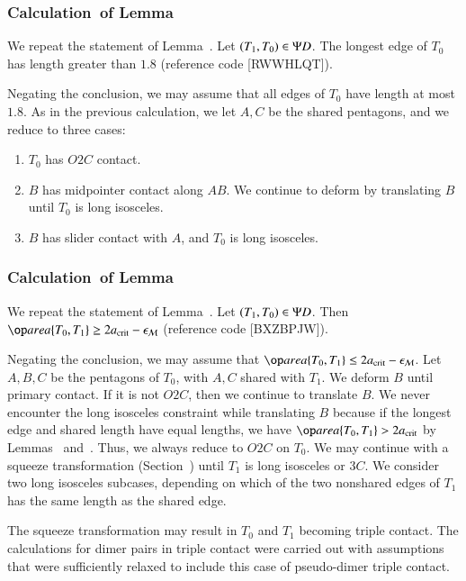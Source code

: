 \subsubsection{Calculation~of Lemma~} \label{sec:pseudo2}

We repeat the statement of Lemma~.
Let $(T_1,T_0)\in \Psi D$.  The longest edge of $T_0$
has length greater than $1.8$ (reference code [RWWHLQT]).


Negating the conclusion, we may assume that all edges of $T_0$ have
length at most $1.8$.  As in the previous calculation, we let $A,C$ be
the shared pentagons, and we reduce to three cases:
\begin{enumerate}
\item $T_0$ has $O2C$ contact.
\item $B$ has midpointer contact along $AB$.  We continue to deform by
  translating $B$ until $T_0$ is long isosceles.
\item $B$ has slider contact with $A$, and $T_0$ is long isosceles.
\end{enumerate}

\subsubsection{Calculation~of Lemma~} \label{sec:pseudo-area}

We repeat the statement of Lemma~.
Let $(T_1,T_0)\in\Psi D$.  Then $\area\{T_0,T_1\} \ge 2\acrit - \epsM$
(reference code [BXZBPJW]).

Negating the conclusion, we may assume that $\area\{T_0,T_1\}\le
2\acrit - \epsM$.  Let $A,B,C$ be the pentagons of $T_0$, with $A,C$
shared with $T_1$.  We deform $B$ until primary contact.  If it is not
$O2C$, then we continue to translate $B$.  We never encounter the long
isosceles constraint while translating $B$ because if the longest edge
and shared length have equal lengths, we have $\area\{T_0,T_1\} >
2\acrit$ by Lemmas~ and~.  Thus,
we always reduce to $O2C$ on $T_0$.  We may continue with a squeeze
transformation (Section~) until $T_1$ is long
isosceles or $3C$.  We consider two long isosceles subcases, depending
on which of the two nonshared edges of $T_1$ has the same length as the
shared edge.

The squeeze transformation may result in $T_0$ and $T_1$ becoming
triple contact.  The calculations for dimer pairs in triple contact
were carried out with assumptions that were sufficiently relaxed to
include this case of pseudo-dimer triple contact.


